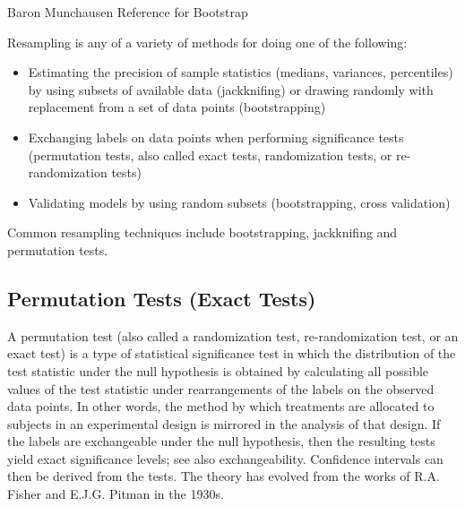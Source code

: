 Baron Munchausen Reference for Bootstrap


Resampling is any of a variety of methods for doing one of the following:

\begin{itemize}
\item Estimating the precision of sample statistics (medians, variances, percentiles) by using subsets of available data (jackknifing) or drawing randomly with replacement from a set of data points (bootstrapping)
\item Exchanging labels on data points when performing significance tests (permutation tests, also called exact tests, randomization tests, or re-randomization tests)
\item Validating models by using random subsets (bootstrapping, cross validation)
\end{itemize}

Common resampling techniques include bootstrapping, jackknifing and permutation tests.


\subsection{Permutation Tests (Exact Tests)}
A permutation test (also called a randomization test, re-randomization test, or an exact test) is a type of statistical significance test in which the distribution of the test statistic under the null hypothesis is obtained by calculating all possible values of the test statistic under rearrangements of the labels on the observed data points. In other words, the method by which treatments are allocated to subjects in an experimental design is mirrored in the analysis of that design. If the labels are exchangeable under the null hypothesis, then the resulting tests yield exact significance levels; see also exchangeability. Confidence intervals can then be derived from the tests. The theory has evolved from the works of R.A. Fisher and E.J.G. Pitman in the 1930s.
